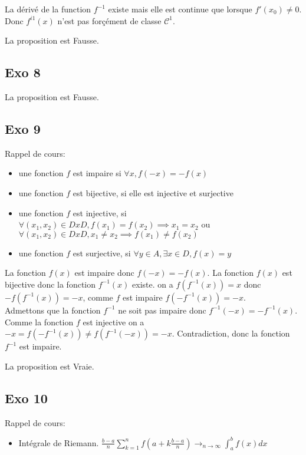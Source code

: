\documentclass[]{book}
\theoremstyle{definition}
\begin{document}
La d\'eriv\'e de la function $f^{-1}$ existe mais elle est continue que lorsque $f'(x_0) \neq 0$. Donc $f^{i1}(x)$ n'est pas for\c{c}\'ement de classe $\mathcal{C}^1$.

La proposition est Fausse.

\subsection*{Exo 8}

La proposition est Fausse.

\subsection*{Exo 9}
Rappel de cours:\\
\begin{itemize}
\item une fonction $f$ est impaire si $\forall x, f(-x) = -f(x)$
\item une fonction $f$ est bijective, si elle est injective et surjective
\item une fonction $f$ est injective, si $\forall (x_1, x_2) \in D x D, f(x_1) = f(x_2) \implies x_1 = x_2$ ou $\forall (x_1, x_2) \in D x D, x_1 \neq x_2 \implies f(x_1) \neq f(x_2)$
\item une fonction $f$ est surjective, si $\forall y \in A, \exists x \in D, f(x) = y$ 
\end{itemize}

La fonction $f(x)$ est impaire donc $f(-x) = -f(x)$. La fonction $f(x)$ est bijective donc la fonction $f^{-1}(x)$ existe.  on a $f(f^{-1}(x)) = x$ donc $-f(f^{-1}(x)) = -x$, comme $f$ est impaire $f(-f^{-1}(x)) = -x$.\\

Admettons que la fonction $f^{-1}$ ne soit pas impaire donc $f^{-1}(-x) = -f^{-1}(x)$. Comme la fonction $f$ est injective on a $-x = f(-f^{-1}(x)) \neq f(f^{-1}(-x)) = -x$. Contradiction, donc la fonction $f^{-1}$ est impaire.

La proposition est Vraie.

\subsection*{Exo 10}
Rappel de cours:
\begin{itemize}
\item Int\'egrale de Riemann. $\frac{b-a}{n}\sum_{k=1}^{n}f(a+k\frac{b-a}{n}) \to_{n \to \infty} \int_{a}^{b} f(x)dx$
\end{itemize}
\end{document}
